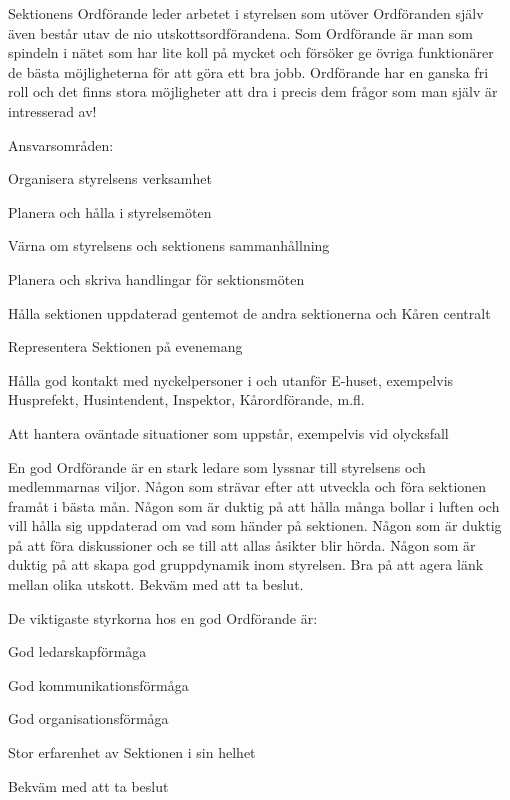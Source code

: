 \documentclass[10pt]{article}
\def\post{Ordförande}
\def\doctitle{[UTKAST] Kravprofil för \post}
\begin{document}
\heading{\doctitle}


Sektionens Ordförande leder arbetet i styrelsen som utöver Ordföranden själv även består utav de nio utskottsordförandena.
Som Ordförande är man som spindeln i nätet som har lite koll på mycket och försöker ge övriga funktionärer de bästa möjligheterna för att göra ett bra jobb.
Ordförande har en ganska fri roll och det finns stora möjligheter att dra i precis dem frågor som man själv är intresserad av!


Ansvarsområden:
\begin{dashlist}
    \item Organisera styrelsens verksamhet
    \item Planera och hålla i styrelsemöten
    \item Värna om styrelsens och sektionens sammanhållning
    \item Planera och skriva handlingar för sektionsmöten
    \item Hålla sektionen uppdaterad gentemot de andra sektionerna och Kåren centralt
    \item Representera Sektionen på evenemang
    \item Hålla god kontakt med nyckelpersoner i och utanför E-huset, exempelvis Husprefekt, Husintendent, Inspektor, Kårordförande, m.fl.
    \item Att hantera oväntade situationer som uppstår, exempelvis vid olycksfall 
\end{dashlist}


En god Ordförande är en stark ledare som lyssnar till styrelsens och medlemmarnas viljor.
Någon som strävar efter att utveckla och föra sektionen framåt i bästa mån. 
Någon som är duktig på att hålla många bollar i luften och vill hålla sig uppdaterad om vad som händer på sektionen.
Någon som är duktig på att föra diskussioner och se till att allas åsikter blir hörda.
Någon som är duktig på att skapa god gruppdynamik inom styrelsen.
Bra på att agera länk mellan olika utskott.
Bekväm med att ta beslut.



De viktigaste styrkorna hos en god Ordförande är:
\begin{dashlist}
    \item God ledarskapförmåga %
    \item God kommunikationsförmåga
    \item God organisationsförmåga
    \item Stor erfarenhet av Sektionen i sin helhet
    \item Bekväm med att ta beslut
\end{dashlist}
\end{document}
